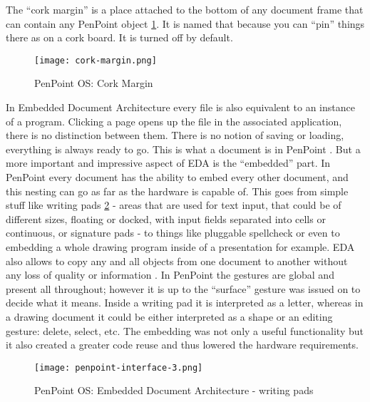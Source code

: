 The ``cork margin'' is a place attached to the bottom of any document frame that
can contain any PenPoint object \ref{fig:cork-margin}. It is named that because
you can ``pin'' things there as on a cork board. It is turned off by default.

\begin{figure}[!h]
    \centering \texttt{[image: cork-margin.png]}
    \caption{PenPoint OS: Cork Margin}
    \label{fig:cork-margin}
\end{figure}

In Embedded Document Architecture every file is also equivalent to an instance
of a program. Clicking a page opens up the file in the associated application,
there is no distinction between them. There is no notion of saving or loading,
everything is always ready to go. This is what a document is in PenPoint
\cite{carr1991} \cite{brown1992}. But a more important and impressive aspect of
EDA is the ``embedded'' part. In PenPoint every document has the ability to
embed every other document, and this nesting can go as far as the hardware is
capable of. This goes from simple stuff like writing pads
\ref{fig:embedded-document-architecture} - areas that are used for text input,
that could be of different sizes, floating or docked, with input fields
separated into cells or continuous, or signature pads - to things like
pluggable spellcheck or even to embedding a whole drawing program inside of
a presentation for example.  EDA also allows to copy any and all objects from
one document to another without any loss of quality or information
\cite{carr1991} \cite{brown1993}. In PenPoint the gestures are global and
present all throughout; however it is up to the ``surface'' gesture was issued
on to decide what it means. Inside a writing pad it is interpreted as a letter,
whereas in a drawing document it could be either interpreted as a shape or an
editing gesture: delete, select, etc. The embedding was not only a useful
functionality but it also created a greater code reuse and thus lowered the
hardware requirements.

\begin{figure}[!h]
    \centering \texttt{[image: penpoint-interface-3.png]}
    \caption{PenPoint OS: Embedded Document Architecture - writing pads}
    \label{fig:embedded-document-architecture}
\end{figure}

